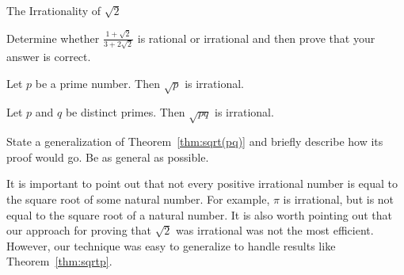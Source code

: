 \begin{section}{The Irrationality of $\sqrt{2}$}
\begin{problem}
Determine whether $\displaystyle \frac{1+\sqrt{2}}{3+2\sqrt{2}}$ is rational or irrational and then prove that your answer is correct.
\end{problem}

\begin{theorem}\label{thm:sqrtp}
Let $p$ be a prime number.  Then $\sqrt{p}$ is irrational.
\end{theorem}


\begin{theorem}\label{thm:sqrt(pq)}
Let $p$ and $q$ be distinct primes.  Then $\sqrt{pq}$ is irrational.
\end{theorem}

\begin{problem}
State a generalization of Theorem~\ref{thm:sqrt(pq)} and briefly describe how its proof would go.  Be as general as possible.
\end{problem}

It is important to point out that not every positive irrational number is equal to the square root of some natural number.  For example, $\pi$ is irrational, but is not equal to the square root of a natural number. It is also worth pointing out that our approach for proving that $\sqrt{2}$ was irrational was not the most efficient.  However, our technique was easy to generalize to handle results like Theorem~\ref{thm:sqrtp}.

\end{section}